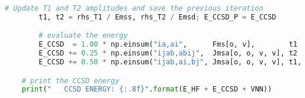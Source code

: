 \begin{lstlisting}[language=Python, caption={\acrshort{ccd} and \acrshort{ccsd} method exercise code solution.}, label=code:cc_solution]
        # Update T1 and T2 amplitudes and save the previous iteration
        t1, t2 = rhs_T1 / Emss, rhs_T2 / Emsd; E_CCSD_P = E_CCSD

        # evaluate the energy
        E_CCSD  = 1.00 * np.einsum("ia,ai",      Fms[o, v],        t1    )
        E_CCSD += 0.25 * np.einsum("ijab,abij",  Jmsa[o, o, v, v], t2    )
        E_CCSD += 0.50 * np.einsum("ijab,ai,bj", Jmsa[o, o, v, v], t1, t1)

    # print the CCSD energy
    print("   CCSD ENERGY: {:.8f}".format(E_HF + E_CCSD + VNN))
\end{lstlisting}

